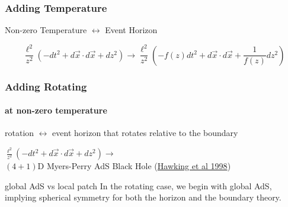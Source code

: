 \documentclass[xcolor=dvipsnames]{beamer}
\begin{document}
\begin{frame}
  \frametitle{Adding Temperature}

  \begin{block}{}Non-zero Temperature $\longleftrightarrow$ Event Horizon\end{block}

  $$\frac {\ell^2}{z^2} \left( -dt^2 + d\vec x\cdot d\vec x + dz^2 \right) \rightarrow \frac {\ell^2}{z^2} \left( -f(z) dt^2 + d\vec x\cdot d\vec x + \frac 1{f(z)}dz^2 \right)$$

  \begin{center}
  \end{center}
\end{frame}

\begin{frame}
  \frametitle{Adding Rotating}
  \framesubtitle{at non-zero temperature}

  \begin{block}{}rotation $\longleftrightarrow$ event horizon that rotates relative to the boundary\end{block}

  \begin{block}{}
    $\frac {\ell^2}{z^2} \left( -dt^2 + d\vec x\cdot d\vec x + dz^2 \right) \rightarrow$ \\$(4+1)$D Myers-Perry AdS Black Hole (\href{https://inspirehep.net/literature/478927}{Hawking et al 1998})
  \end{block}

  \begin{alertblock}{global AdS vs local patch}
    In the rotating case, we begin with global AdS, implying spherical symmetry for both the horizon and the boundary theory.
  \end{alertblock}


\end{frame}
\end{document}
